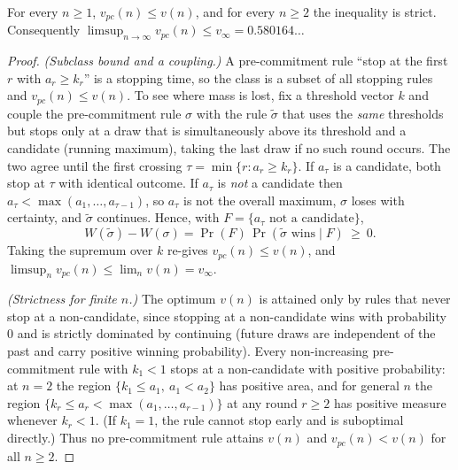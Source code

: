 \documentclass[10pt,a4paper]{amsart}
\begin{document}
\begin{proposition}\label{prop:subopt}
For every $n\ge 1$, $v_{pc}(n)\le v(n)$, and for every $n\ge 2$ the inequality is strict.
Consequently $\limsup_{n\to\infty} v_{pc}(n)\le v_\infty=0.580164\ldots$
\end{proposition}

\begin{proof}
\textit{(Subclass bound and a coupling.)} A pre-commitment rule ``stop at the first $r$
with $a_r\ge k_r$'' is a stopping time, so the class is a subset of all stopping rules
and $v_{pc}(n)\le v(n)$. To see where mass is lost, fix a threshold vector $k$ and couple
the pre-commitment rule $\sigma$ with the rule $\tilde\sigma$ that uses the \emph{same}
thresholds but stops only at a draw that is simultaneously above its threshold and a
candidate (running maximum), taking the last draw if no such round occurs. The two agree
until the first crossing $\tau=\min\{r:a_r\ge k_r\}$. If $a_\tau$ is a candidate, both
stop at $\tau$ with identical outcome. If $a_\tau$ is \emph{not} a candidate then
$a_\tau<\max(a_1,\dots,a_{\tau-1})$, so $a_\tau$ is not the overall maximum, $\sigma$
loses with certainty, and $\tilde\sigma$ continues. Hence, with
$F=\{a_\tau\text{ not a candidate}\}$,
\begin{equation}\label{eq:coupling}
  W(\tilde\sigma)-W(\sigma)=\Pr(F)\,\Pr(\tilde\sigma\text{ wins}\mid F)\ \ge\ 0 .
\end{equation}
Taking the supremum over $k$ re-gives $v_{pc}(n)\le v(n)$, and $\limsup_n v_{pc}(n)\le
\lim_n v(n)=v_\infty$.

\textit{(Strictness for finite $n$.)} The optimum $v(n)$ is attained only by rules that
never stop at a non-candidate, since stopping at a non-candidate wins with probability
$0$ and is strictly dominated by continuing (future draws are independent of the past and
carry positive winning probability). Every non-increasing pre-commitment rule with
$k_1<1$ stops at a non-candidate with positive probability: at $n=2$ the region
$\{k_1\le a_1,\ a_1<a_2\}$ has positive area, and for general $n$ the region
$\{k_r\le a_r<\max(a_1,\dots,a_{r-1})\}$ at any round $r\ge 2$ has positive measure
whenever $k_r<1$. (If $k_1=1$, the rule cannot stop early and is suboptimal directly.)
Thus no pre-commitment rule attains $v(n)$ and $v_{pc}(n)<v(n)$ for all $n\ge 2$.
\end{proof}
\end{document}
